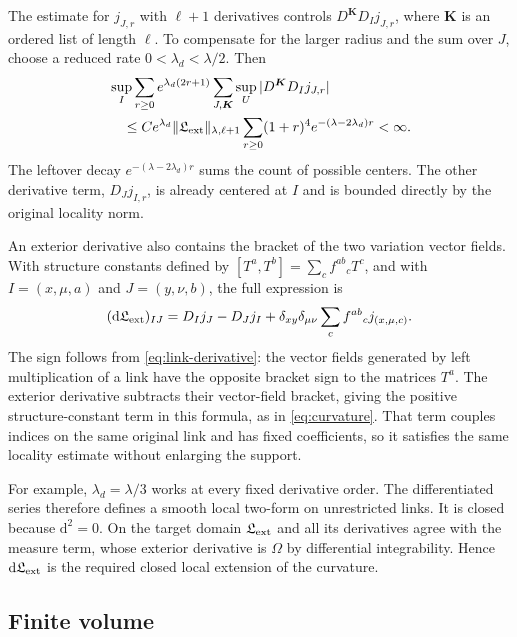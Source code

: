\documentclass[11pt,a4paper]{article}
\theoremstyle{remark}
\newcommand{\dd}{\mathrm d}
\begin{document}
The estimate for $j_{J,r}$ with $\ell+1$ derivatives controls
$D^{\boldsymbol K}D_Ij_{J,r}$, where $\boldsymbol K$ is an ordered
list of length $\ell$. To compensate for the larger radius and the
sum over $J$, choose a reduced rate $0<\lambda_d<\lambda/2$.
Then
\begin{equation}
 \begin{split}
 &\sup_I\sum_{r\ge0}e^{\lambda_d(2r+1)}
       \sum_{J,\boldsymbol K}\sup_U
                 |D^{\boldsymbol K}D_Ij_{J,r}|\\
 &\quad\le C e^{\lambda_d}
       \|\mathfrak L_{\rm ext}\|_{\lambda,\ell+1}
       \sum_{r\ge0}(1+r)^4e^{-(\lambda-2\lambda_d)r}<\infty.
 \end{split}
 \label{eq:exterior-locality-bound}
\end{equation}
The leftover decay $e^{-(\lambda-2\lambda_d)r}$ sums the count of
possible centers. The other derivative term, $D_Jj_{I,r}$, is already
centered at $I$ and is bounded directly by the original locality norm.

An exterior derivative also contains the bracket of the two variation
vector fields. With structure constants defined by
$[T^a,T^b]=\sum_c f^{ab}{}_cT^c$, and with
$I=(x,\mu,a)$ and $J=(y,\nu,b)$, the full expression is
\begin{equation}
 (\dd\mathfrak L_{\rm ext})_{IJ}
  =D_Ij_J-D_Jj_I
       +\delta_{xy}\delta_{\mu\nu}\sum_c f^{ab}{}_c j_{(x,\mu,c)}.
\end{equation}
The sign follows from \eqref{eq:link-derivative}: the vector fields
generated by left multiplication of a link have the opposite bracket
sign to the matrices $T^a$. The exterior derivative subtracts their
vector-field bracket, giving the positive structure-constant term in
this formula, as in \eqref{eq:curvature}. That term couples indices
on the same original link and has fixed coefficients, so it satisfies
the same locality estimate without enlarging the support.

For example, $\lambda_d=\lambda/3$ works at every fixed derivative
order. The differentiated series therefore defines a smooth local
two-form on unrestricted links. It is closed because $\dd^2=0$.
On the target domain $\mathfrak L_{\rm ext}$ and all its derivatives
agree with the measure term, whose exterior derivative is $\Omega$
by differential integrability. Hence $\dd\mathfrak L_{\rm ext}$
is the required closed local extension of the curvature.

\subsection{Finite volume}
\end{document}
